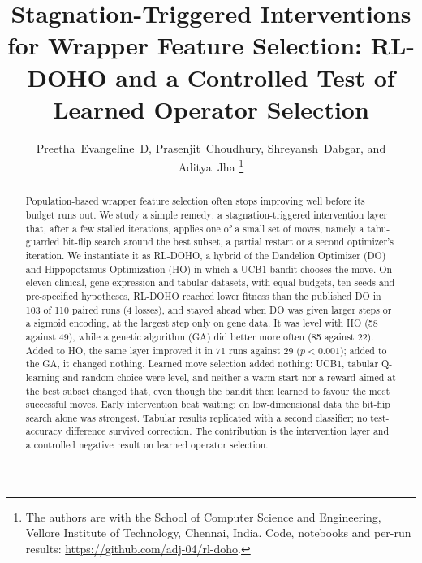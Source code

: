 \documentclass[journal]{IEEEtran}
\begin{document}
\title{Stagnation-Triggered Interventions for Wrapper Feature Selection: RL-DOHO and a Controlled Test of Learned Operator Selection}

\author{Preetha~Evangeline~D, Prasenjit~Choudhury, Shreyansh~Dabgar, and Aditya~Jha%
\thanks{The authors are with the School of Computer Science and Engineering, Vellore Institute of Technology, Chennai, India. %
Code, notebooks and per-run results: \url{https://github.com/adj-04/rl-doho}.}}


\maketitle

\begin{abstract}
Population-based wrapper feature selection often stops improving well before its budget runs out. We study a simple remedy: a stagnation-triggered intervention layer that, after a few stalled iterations, applies one of a small set of moves, namely a tabu-guarded bit-flip search around the best subset, a partial restart or a second optimizer's iteration. We instantiate it as RL-DOHO, a hybrid of the Dandelion Optimizer (DO) and Hippopotamus Optimization (HO) in which a UCB1 bandit chooses the move. On eleven clinical, gene-expression and tabular datasets, with equal budgets, ten seeds and pre-specified hypotheses, RL-DOHO reached lower fitness than the published DO in 103 of 110 paired runs (4 losses), and stayed ahead when DO was given larger steps or a sigmoid encoding, at the largest step only on gene data. It was level with HO (58 against 49), while a genetic algorithm (GA) did better more often (85 against 22). Added to HO, the same layer improved it in 71 runs against 29 ($p<0.001$); added to the GA, it changed nothing. Learned move selection added nothing: UCB1, tabular Q-learning and random choice were level, and neither a warm start nor a reward aimed at the best subset changed that, even though the bandit then learned to favour the most successful moves. Early intervention beat waiting; on low-dimensional data the bit-flip search alone was strongest. Tabular results replicated with a second classifier; no test-accuracy difference survived correction. The contribution is the intervention layer and a controlled negative result on learned operator selection.
\end{abstract}
\end{document}
